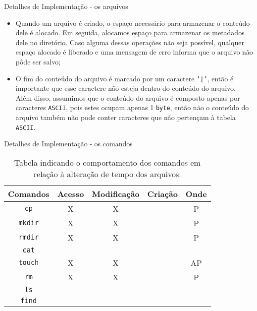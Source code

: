 \documentclass[10pt]{beamer}
\begin{document}
    \begin{frame}{Detalhes de Implementação - os arquivos}
        \begin{itemize}
            \justifying
            \item Quando um arquivo é criado, o espaço necessário para armazenar o conteúdo dele é alocado. Em seguida, alocamos espaço para armazenar os metadados dele no diretório. Caso alguma dessas operações não seja possível, qualquer espaço alocado é liberado e uma mensagem de erro informa que o arquivo não pôde ser salvo;
            \item O fim do conteúdo do arquivo é marcado por um caractere \texttt{'|'}, então é importante que esse caractere não esteja dentro do conteúdo do arquivo. Além disso, assumimos que o conteúdo do arquivo é composto apenas por caracteres \texttt{ASCII}, pois estes ocupam apenas 1 \texttt{byte}, então não o conteúdo do arquivo também não pode conter caracteres que não pertençam à tabela \texttt{ASCII}.
        \end{itemize}
    \end{frame}
    \begin{frame}{Detalhes de Implementação - os comandos}
        \centering
        \begin{table}
            \begin{tabular}{|c|c|c|c|c|}
                \hline
                Comandos & Acesso & Modificação & Criação & Onde \\
                \hline
                \texttt{cp} & X & X & & P \\
                \hline
                \texttt{mkdir} & X & X & & P \\
                \hline
                \texttt{rmdir} & X & X & & P \\
                \hline
                \texttt{cat} &  &  & &  \\
                \hline
                \texttt{touch} & X & X & & AP \\
                \hline
                \texttt{rm} & X & X & & P \\
                \hline
                \texttt{ls} &  &  & &  \\
                \hline
                \texttt{find} &  &  & &  \\
                \hline
            \end{tabular}
            \caption{Tabela indicando o comportamento dos comandos em relação à alteração de tempo dos arquivos.} \label{tabela}
        \end{table}
    \end{frame}
\end{document}

